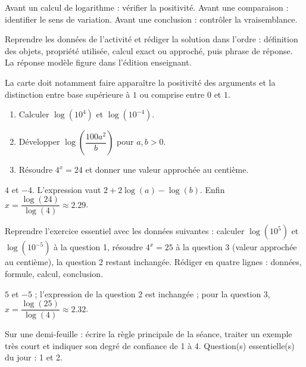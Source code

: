 \begin{summary}Avant un calcul de logarithme : vérifier la positivité. Avant une comparaison : identifier le sens de variation. Avant une conclusion : contrôler la vraisemblance.\end{summary}

\begin{example}
Reprendre les données de l'activité et rédiger la solution dans l'ordre : définition des objets, propriété utilisée, calcul exact ou approché, puis phrase de réponse. La réponse modèle figure dans l'édition enseignant.
\end{example}
\begin{solution}La carte doit notamment faire apparaître la positivité des arguments et la distinction entre base supérieure à $1$ ou comprise entre $0$ et $1$.\end{solution}

\begin{exercise}[essentiel]
\begin{enumerate}\item Calculer $\log(10^4)$ et $\log(10^{-4})$.\item Développer $\log\!\left(\dfrac{100a^2}{b}\right)$ pour $a,b>0$.\item Résoudre $4^x=24$ et donner une valeur approchée au centième.\end{enumerate}
\end{exercise}
\begin{solution}$4$ et $-4$. L'expression vaut $2+2\log(a)-\log(b)$. Enfin $x=\dfrac{\log(24)}{\log(4)}\approx\num{2,29}$.\end{solution}


\begin{homework}Reprendre l'exercice essentiel avec les données suivantes : calculer $\log(10^{5})$ et $\log(10^{-5})$ à la question 1, résoudre $4^x=25$ à la question 3 (valeur approchée au centième), la question 2 restant inchangée. Rédiger en quatre lignes : données, formule, calcul, conclusion.\end{homework}
\begin{solution}$5$ et $-5$ ; l'expression de la question 2 est inchangée ; pour la question 3, $x=\dfrac{\log(25)}{\log(4)}\approx\num{2,32}$.\end{solution}

\begin{exitticket}[3 minutes]Sur une demi-feuille : écrire la règle principale de la séance, traiter un exemple très court et indiquer son degré de confiance de 1 à 4. Question(s) essentielle(s) du jour : 1 et 2.\end{exitticket}

